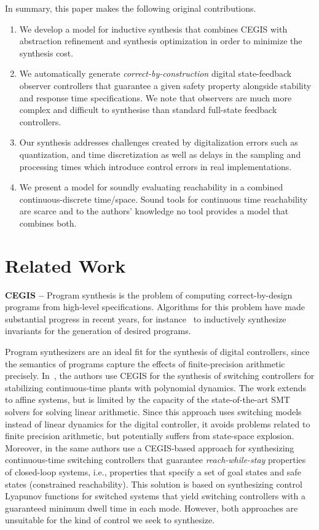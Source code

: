 \documentclass[sigconf]{llncs}
\begin{document}
In summary, this paper makes the following original contributions.
%
\begin{enumerate}
\item We develop a model for inductive synthesis that combines CEGIS with
abstraction refinement and synthesis optimization in order to minimize the
synthesis cost. 
%
\item We automatically generate \emph{correct-by-construction} digital
  state-feedback observer controllers that guarantee a given safety property
  alongside stability and response time specifications.  We note that
  observers are much more complex and difficult to synthesise than standard
  full-state feedback controllers.
%
\item  Our synthesis addresses challenges created by digitalization errors
 such as quantization, and time discretization as well as delays in the
 sampling and processing times which introduce control errors in real
 implementations.
 \item We present a model for soundly evaluating reachability in a combined 
 continuous-discrete time/space. Sound tools for continuous time reachability 
 are scarce and to the authors' knowledge no tool provides a model that 
 combines both. 
\end{enumerate}

\section{Related Work}
\label{sec:relw}

\textbf{CEGIS --}
Program synthesis is the problem of computing correct-by-design programs
from high-level specifications.  Algorithms for this problem have made
substantial progress in recent years, for instance~\cite{itzhaky2010simple}
to inductively synthesize invariants for the generation of desired programs.

Program synthesizers are an ideal fit for the synthesis of digital
controllers, since the semantics of programs capture the effects of
finite-precision arithmetic precisely. 
In~\cite{DBLP:conf/cdc/RavanbakhshS15}, the authors use CEGIS for the
synthesis of switching controllers for stabilizing continuous-time plants
with polynomial dynamics.  The work extends to affine systems, but is
limited by the capacity of the state-of-the-art SMT solvers for solving
linear arithmetic.  Since this approach uses switching models instead of
linear dynamics for the digital controller, it avoids problems related to
finite precision arithmetic, but potentially suffers from state-space
explosion.  Moreover, in \cite{DBLP:conf/emsoft/RavanbakhshS16} the same
authors use a CEGIS-based approach for synthesizing continuous-time
switching controllers that guarantee \emph{reach-while-stay} properties of
closed-loop systems, i.e., properties that specify a set of goal states and
safe states (constrained reachability).  This solution is based on
synthesizing control Lyapunov functions for switched systems that yield
switching controllers with a guaranteed minimum dwell time in each mode. 
However, both approaches are unsuitable for the kind of control we seek to
synthesize.
\end{document}
